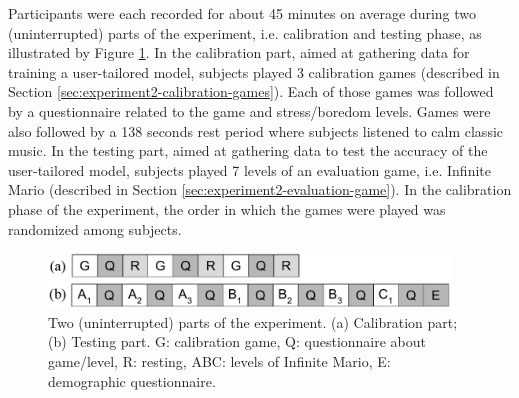 Participants were each recorded for about 45 minutes on average during two (uninterrupted) parts of the experiment, i.e. calibration and testing phase, as illustrated by Figure \ref{fig:experiment2-parts}. In the calibration part, aimed at gathering data for training a user-tailored model, subjects played 3 calibration games (described in Section \ref{sec:experiment2-calibration-games}). Each of those games was followed by a questionnaire related to the game and stress/boredom levels. Games were also followed by a 138 seconds rest period where subjects listened to calm classic music. In the testing part, aimed at gathering data to test the accuracy of the user-tailored model, subjects played 7 levels of an evaluation game, i.e. Infinite Mario (described in Section \ref{sec:experiment2-evaluation-game}). In the calibration phase of the experiment, the order in which the games were played was randomized among subjects.


\begin{figure}[ht]
  \centering
  \includegraphics[width=0.95\textwidth]{Content/figures/experiment2-parts}
  \caption{Two (uninterrupted) parts of the experiment. (a) Calibration part; (b) Testing part. G: calibration game, Q: questionnaire about game/level, R: resting, ABC: levels of Infinite Mario, E: demographic questionnaire.}
  \label{fig:experiment2-parts}
\end{figure}


